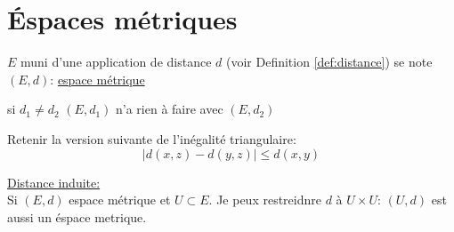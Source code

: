 \documentclass[a4paper]{report}
\theoremstyle{definition}
\begin{document}
\chapter{Éspaces métriques}
\begin{definition}
    $E$ muni d'une application de distance $d$ (voir Definition \ref{def:distance}) se note  $(E, d)$: \underline{espace métrique}
\end{definition}
\begin{remark}
   si $d_1 \neq d_2$ $(E, d_1)$ n'a rien à faire avec  $(E, d_2)$ 
\end{remark}
\begin{remark}
    Retenir la version suivante de l'inégalité triangulaire:
    \[
        |d(x, z) - d(y, z)| \le d(x, y)
    \] 
\end{remark}
\begin{remark}
    \underline{Distance induite:}\\
    Si $(E, d)$ espace métrique et  $U \subset E$. Je peux restreidnre $d$ à  $U \times U$:  $(U, d)$ est aussi un éspace metrique.
\end{remark}
\end{document}
